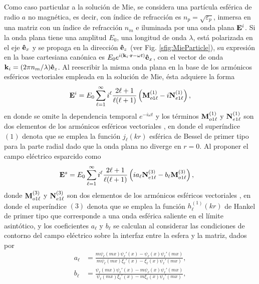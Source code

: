 \documentclass[letterpaper,11pt] {article}
\begin{document}
Como caso particular a la solución de Mie, se considera una partícula esférica de radio $a$ no magnética, es decir, con índice de refracción es $n_p = \sqrt{\varepsilon_p}$,  inmersa en  una matriz con un índice de refracción $n_m$ e  iluminada por una onda plana $\vb{E}^i$.  Si la onda plana tiene una amplitud $E_0$, una longitud de onda $\lambda$, está  polarizada en el eje $\vu{e}_x$ y se propaga en la dirección $\vu{e}_z$ (ver Fig.  \ref{sfig:MieParticle}), su expresión en la base cartesiana canónica es $E_0 e^{i(\vb{k}_i\cdot\vb{r} - \omega t)}\vu{e}_x$, con el vector de onda $\vb{k}_i = (2\pi n_m/\lambda) \vu{e}_z$.  Al reescribir la misma onda plana en la base de los armónicos esféricos vectoriales empleada en la solución de Mie, ésta adquiere la forma \cite{bohren1998absorption}
	\begin{equation}
\vb{E}^i = E_0 \sum_{\ell=1}^\infty  i^\ell\frac{2\ell+1}{\ell(\ell+1)} \left( \vb{M}_{o1\ell}^{(1)} - i \vb{N}_{e1\ell}^{(1)}   \right),\label{eq:OndaPlana}
	\end{equation}
en donde se omite la dependencia temporal $e^{-i\omega t}$ y los términos $\vb{M}_{o1\ell}^{(1)}$ y $\vb{N}_{e1\ell}^{(1)}$ son dos elementos de los armónicos esféricos vectoriales  \cite{bohren1998absorption}, en donde el superíndice $(1)$ denota que se emplea la función $j_\ell ( k r)$ esférica de Bessel de primer tipo para la parte radial dado que la onda plana no diverge en $r = 0$.  Al proponer el campo eléctrico esparcido como
\begin{align}
\vb{E}^s &= E_0 \sum_{\ell=1}^\infty  i^\ell\frac{2\ell+1}{\ell(\ell+1)} \left(i a_\ell \vb{N}_{e1\ell}^{(3)} - b_\ell \vb{M}_{o1\ell}^{(3)}   \right), \label{eq:Es}
\end{align}
donde $\vb{M}_{o1\ell}^{(3)}$ y $\vb{N}_{e1\ell}^{(3)}$ son dos elementos de los armónicos esféricos vectoriales \cite{bohren1998absorption}, en donde el superíndice $(3)$ denota que se emplea la función $h_\ell^{(1)}(k r)$ de Hankel de primer tipo que corresponde a una onda esférica saliente en el límite asintótico, y  los coeficientes  $a_\ell$ y $b_\ell$ se calculan al considerar las condiciones de contorno del campo eléctrico sobre la interfaz entre la esfera y la matriz, dados por \cite{bohren1998absorption}
	\begin{subequations}
	\begin{align}
	a_\ell &= \frac{m\psi_\ell(mx)\psi_\ell'(x)-\psi_\ell(x)\psi_\ell' (mx)}
				{m\psi_\ell(mx)\xi_\ell'(x)-\xi_\ell(x)\psi_\ell'(mx)},
				\label{eq:an}\\
	b_\ell &= \frac{\psi_\ell(mx)\psi_\ell'(x)-m\psi_\ell(x)\psi_\ell' (mx)}
			{\psi_\ell(mx)\xi_\ell'(x)-m\xi_\ell(x)\psi_\ell'(mx)},
			 \label{eq:bn}
	\end{align}			 
	\label{eq:MieCoef}
	\end{subequations}
\end{document}
